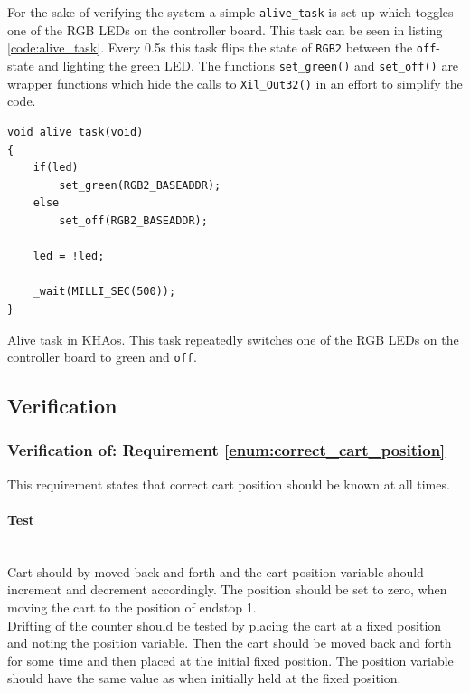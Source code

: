 \\~\\
For the sake of verifying the system a simple \texttt{alive\_task} is set up which toggles one of the RGB LEDs on the controller board.
This task can be seen in listing \ref{code:alive_task}.
Every 0.5s this task flips the state of \texttt{RGB2} between the \texttt{off}-state and lighting the green LED.
The functions \texttt{set\_green()} and \texttt{set\_off()} are wrapper functions which hide the calls to \texttt{Xil\_Out32()} in an effort to simplify the code.
\begin{listing}[H]
\begin{verbatim}
void alive_task(void)
{
	if(led)
		set_green(RGB2_BASEADDR);
	else
		set_off(RGB2_BASEADDR);

	led = !led;

	_wait(MILLI_SEC(500));
}
\end{verbatim}
\caption[Alive task in KHAos.]{Alive task in KHAos. This task repeatedly switches one of the RGB LEDs on the controller board to green and \texttt{off}.}
\label{code:alive_task}
\end{listing}

\subsection{Verification} %
\label{ssub:verification_controller_board_software}
\subsubsection{Verification of: Requirement \ref{enum:correct_cart_position}} %
\label{ssub:verification_of_requirement_enum:correct_cart_position}
This requirement states that correct cart position should be known at all times.

\paragraph{Test}~\\
Cart should by moved back and forth and the cart position variable should increment and decrement accordingly.
The position should be set to zero, when moving the cart to the position of endstop 1.
\\
Drifting of the counter should be tested by placing the cart at a fixed position and noting the position variable.
Then the cart should be moved back and forth for some time and then placed at the initial fixed position. 
The position variable should have the same value as when initially held at the fixed position.

